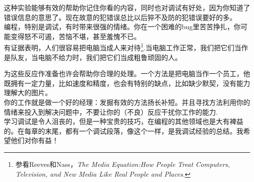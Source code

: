 \documentclass[10pt]{book}
\begin{document}

这种实验能够有效的帮助你记住你看的内容，同时也对调试有好处，因为你知道了错误信息的意思了。现在故意的犯错误总比以后猝不及防的犯错误要好的多。\\

编程，特别是调试，有时带来很强的情绪。你在一个困难的bug里苦苦挣扎，你可能变得怒不可遏，苦恼不堪，甚至羞愧不已。\\

有证据表明，人们很容易把电脑当成人来对待\footnote{参看Reeves和Nass，{\it The Media Equation:How People Treat Computers, Television, and New Media Like Real People and Places}.}.当电脑工作正常，我们把它们当作是队友，当电脑不给力时，我们把它们当成粗鲁顽固的人。\\


为这些反应作准备也许会帮助你合理的处理。一个方法是把电脑当作一个员工，他既拥有一定力量，比如速度和精度，也会有特别的缺点，比如缺少默契，没有能力理解大的图片。\\

你的工作就是做一个好的经理：发掘有效的方法扬长补短。并且寻找方法利用你的情绪来投入到解决问题中，不要让你的（不良）反应干扰你工作的能力.\\

学习调试是令人沮丧的，但是一种宝贵的技巧，在编程的其他领域也是大有裨益的。在每章的末尾，都有一个调试段落，像这个一样，是我调试经验的总结。我希望他们对你有益！
\end{document}
